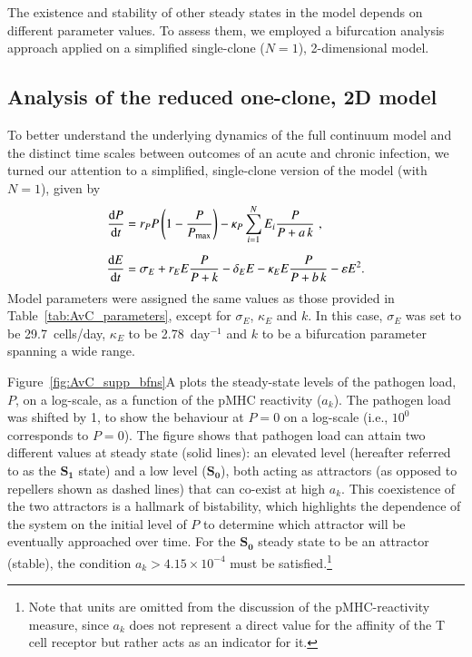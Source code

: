 The existence and stability of other steady states in the model depends on different parameter values. To assess them, we employed a bifurcation analysis approach applied on a simplified single-clone ($N=1$), 2-dimensional model.


\subsection{Analysis of the reduced one-clone, 2D model}
\label{sec:AvC_2DmodelAnalysis}

To better understand the underlying dynamics of the full continuum model and the distinct time scales between outcomes of an acute and chronic infection, we turned our attention to a simplified, single-clone version of the model (with $N=1$), given by
%
\begin{align*}
    \dv{P}{t} &= r_P P \left(1 - \frac{P}{P_{\textrm{max}}}\right) - \kappa_P \sum_{i=1}^N E_i \frac{P}{P+a \, k}\,\,, \\[0.5em]
    \dv{E}{t} &= \sigma_E+ r_E E \frac{P}{P+k} - \delta_E E - \kappa_E E \frac{P}{P+b \, k} - \varepsilon E^2.
\end{align*}
%
Model parameters were assigned the same values as those provided in Table~\ref{tab:AvC_parameters}, except for $\sigma_E$, $\kappa_E$ and $k$. In this case, $\sigma_E$ was set to be 29.7~cells/day, $\kappa_E$ to be 2.78~day$^{-1}$ and $k$ to be a bifurcation parameter spanning a wide range.

Figure~\ref{fig:AvC_supp_bfns}A plots the steady-state levels of the pathogen load, $P$, on a log-scale, as a function of the pMHC reactivity ($a_k$). The pathogen load was shifted by 1, to show the behaviour at $P=0$ on a log-scale (i.e., $10^0$ corresponds to $P=0$). The figure shows that pathogen load can attain two different values at steady state (solid lines): an elevated level (hereafter referred to as the $\boldsymbol{S_1}$ state) and a low level ($\boldsymbol{S_0}$), both acting as attractors (as opposed to repellers shown as dashed lines) that can co-exist at high $a_k$. This coexistence of the two attractors is a hallmark of bistability, which highlights the dependence of the system on the initial level of $P$ to determine which attractor will be eventually approached over time. For the $\boldsymbol{S_0}$ steady state to be an attractor (stable), the condition $a_k > 4.15 \times 10^{-4}$ must be satisfied.\footnote{Note that units are omitted from the discussion of the pMHC-reactivity measure, since $a_k$ does not represent a direct value for the affinity of the T cell receptor but rather acts as an indicator for it.}

